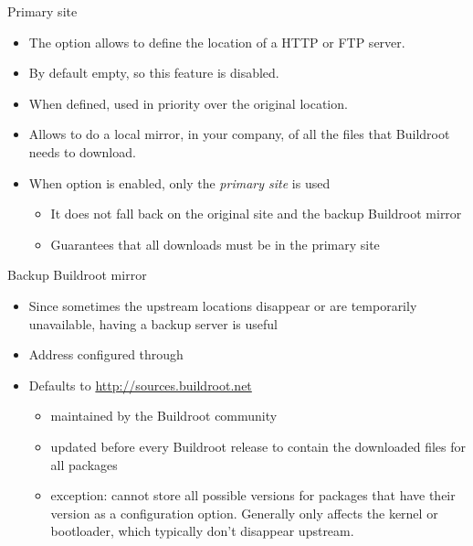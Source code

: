 \begin{frame}{Primary site}
  \begin{itemize}
  \item The  option allows to define the
    location of a HTTP or FTP server.
  \item By default empty, so this feature is disabled.
  \item When defined, used in priority over the original location.
  \item Allows to do a local mirror, in your company, of all the files
    that Buildroot needs to download.
  \item When option  is enabled, only the
    {\em primary site} is used
    \begin{itemize}
    \item It does not fall back on the original site and the backup
      Buildroot mirror
    \item Guarantees that all downloads must be in the primary site
    \end{itemize}
  \end{itemize}
\end{frame}

\begin{frame}{Backup Buildroot mirror}
  \begin{itemize}
  \item Since sometimes the upstream locations disappear or are
    temporarily unavailable, having a backup server is useful
  \item Address configured through 
  \item Defaults to \url{http://sources.buildroot.net}
    \begin{itemize}
    \item maintained by the Buildroot community
    \item updated before every Buildroot release to contain the
      downloaded files for all packages
    \item exception: cannot store all possible versions for packages
      that have their version as a configuration option. Generally
      only affects the kernel or bootloader, which typically don't
      disappear upstream.
    \end{itemize}
  \end{itemize}
\end{frame}

